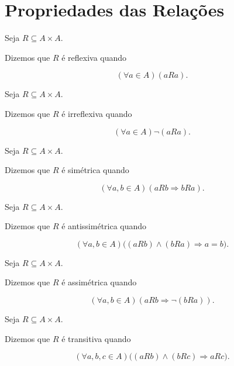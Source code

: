 \documentclass[../../main]{subfiles}
\begin{document}
\section{Propriedades das Relações}
\label{sec:matematica:relacoes:propriedades}

\begin{defn}

	Seja \(R\subseteq A\times A\).

	Dizemos que \(R\) é reflexiva quando

	\[
		(\forall a\in A)
		(aRa).
	\]

\end{defn}

\begin{defn}

	Seja \(R\subseteq A\times A\).

	Dizemos que \(R\) é irreflexiva quando

	\[
		(\forall a\in A)
		\neg(aRa).
	\]

\end{defn}

\begin{defn}

	Seja \(R\subseteq A\times A\).

	Dizemos que \(R\) é simétrica quando

	\[
		(\forall a,b\in A)
		(aRb \Rightarrow bRa).
	\]

\end{defn}

\begin{defn}

	Seja \(R\subseteq A\times A\).

	Dizemos que \(R\) é antissimétrica quando

	\[
		(\forall a,b\in A)
		\bigl(
		(aRb)
		\land
		(bRa)
		\Rightarrow
		a=b
		\bigr).
	\]

\end{defn}

\begin{defn}

	Seja \(R\subseteq A\times A\).

	Dizemos que \(R\) é assimétrica quando

	\[
		(\forall a,b\in A)
		(aRb \Rightarrow \neg(bRa)).
	\]

\end{defn}

\begin{defn}

	Seja \(R\subseteq A\times A\).

	Dizemos que \(R\) é transitiva quando

	\[
		(\forall a,b,c\in A)
		\bigl(
		(aRb)
		\land
		(bRc)
		\Rightarrow
		aRc
		\bigr).
	\]

\end{defn}
\end{document}
